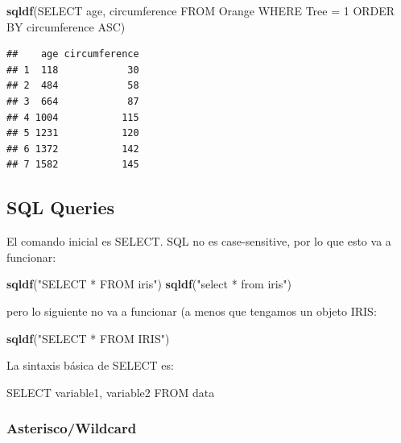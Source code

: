 \documentclass[
]{book}
\newenvironment{Shaded}{\begin{snugshade}}{\end{snugshade}}
\newcommand{\FunctionTok}[1]{\textcolor[rgb]{0.13,0.29,0.53}{\textbf{#1}}}
\newcommand{\NormalTok}[1]{#1}
\newcommand{\StringTok}[1]{\textcolor[rgb]{0.31,0.60,0.02}{#1}}
\begin{document}
\begin{Shaded}
\begin{Highlighting}[]
\FunctionTok{sqldf}\NormalTok{(}\StringTok{\textquotesingle{}SELECT age, circumference FROM Orange WHERE Tree = 1 ORDER BY circumference ASC\textquotesingle{}}\NormalTok{)}
\end{Highlighting}
\end{Shaded}

\begin{verbatim}
##    age circumference
## 1  118            30
## 2  484            58
## 3  664            87
## 4 1004           115
## 5 1231           120
## 6 1372           142
## 7 1582           145
\end{verbatim}

\subsection{SQL Queries}\label{sql-queries}

El comando inicial es SELECT. SQL no es case-sensitive, por lo que esto va a funcionar:

\begin{Shaded}
\begin{Highlighting}[]
\FunctionTok{sqldf}\NormalTok{(}\StringTok{"SELECT * FROM iris"}\NormalTok{)}
\FunctionTok{sqldf}\NormalTok{(}\StringTok{"select * from iris"}\NormalTok{)}
\end{Highlighting}
\end{Shaded}

pero lo siguiente no va a funcionar (a menos que tengamos un objeto IRIS:

\begin{Shaded}
\begin{Highlighting}[]
\FunctionTok{sqldf}\NormalTok{(}\StringTok{"SELECT * FROM IRIS"}\NormalTok{)}
\end{Highlighting}
\end{Shaded}

La sintaxis básica de SELECT es:

\begin{Shaded}
\begin{Highlighting}[]
\NormalTok{SELECT variable1, variable2 FROM data}
\end{Highlighting}
\end{Shaded}

\subsubsection{Asterisco/Wildcard}\label{asteriscowildcard}
\end{document}
